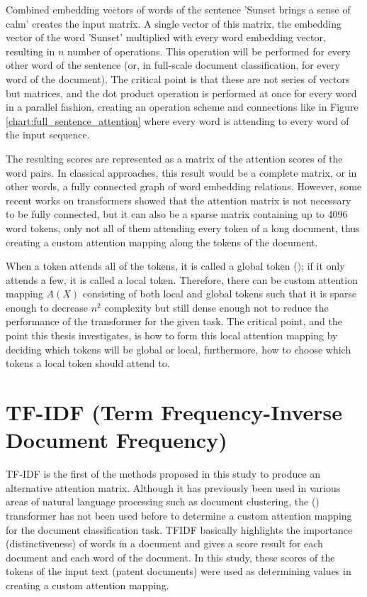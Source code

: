 \documentclass{iyte}
\begin{document}
Combined embedding vectors of words of the sentence 'Sunset brings a sense of calm' creates the input matrix. A single vector of this matrix, the embedding vector of the word 'Sunset' multiplied with every word embedding vector, resulting in \(n\) number of operations. This operation will be performed for every other word of the sentence (or, in full-scale document classification, for every word of the document). The critical point is that these are not series of vectors but matrices, and the dot product operation is performed at once for every word in a parallel fashion, creating an operation scheme and connections like in Figure \ref{chart:full_sentence_attention} where every word is attending to every word of the input sequence.



The resulting scores are represented as a matrix of the attention scores of the word pairs. In classical approaches, this result would be a complete matrix, or in other words, a fully connected graph of word embedding relations. However, some recent works on transformers showed that the attention matrix is not necessary to be fully connected, but it can also be a sparse matrix containing up to 4096 word tokens, only not all of them attending every token of a long document, thus creating a custom attention mapping along the tokens of the document.

When a token attends all of the tokens, it is called a global token (\citealt{BigBird}); if it only attends a few, it is called a local token. Therefore, there can be custom attention mapping $A(X)$ consisting of both local and global tokens such that it is sparse enough to decrease \(n^2\) complexity but still dense enough not to reduce the performance of the transformer for the given task. The critical point, and the point this thesis investigates, is how to form this local attention mapping by deciding which tokens will be global or local, furthermore, how to choose which tokens a local token should attend to.

\section{TF-IDF (Term Frequency-Inverse Document Frequency)}

TF-IDF is the first of the methods proposed in this study to produce an alternative attention matrix. Although it has previously been used in various areas of natural language processing such as document clustering, the (\cite{tfidf}) transformer has not been used before to determine a custom attention mapping for the document classification task. TFIDF basically highlights the importance (distinctiveness) of words in a document and gives a score result for each document and each word of the document. In this study, these scores of the tokens of the input text (patent documents) were used as determining values in creating a custom attention mapping.
\end{document}
